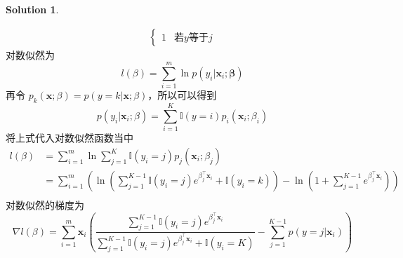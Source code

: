 \documentclass[a4paper,UTF8]{article}
\numberwithin{equation}{section}
\theoremstyle{definition}
\newtheorem*{solution}{Solution}
\def \x {\mathbf{x}}
\begin{document}
\begin{solution}
\begin{itemize}
\begin{align*}
\begin{cases}
				1 & \text{若$y$等于$j$}
			\end{cases}
		\end{align*}
		对数似然为
		\begin{equation*}
			l (\beta) = \sum_{i=1}^{m} \ln p(y_i|\x_i;\mathbf{\beta})
		\end{equation*}
		再令 $p_k(\x;\beta) = p(y=k|\x;\beta)$，所以可以得到
		\begin{equation*}
			p(y_i|\x_i; \beta) = \sum_{i=1}^{K}\mathbb{I}(y=i)p_i(\x_i;\beta_i)
		\end{equation*}
		将上式代入对数似然函数当中
		\begin{align*}
			l(\beta) &= \sum_{i=1}^{m} \ln \sum_{j=1}^{K}\mathbb{I}(y_i=j)p_j(\x_i; \beta_j) \\
			&= \sum_{i=1}^{m}\left(\ln \left( \sum_{j=1}^{K-1}\mathbb{I}(y_i=j)e^{\beta_j^\top\x_i} + \mathbb{I}(y_i=k) \right) - \ln \left( 1+\sum_{j=1}^{K-1}e^{\beta_j^\top\x_i} \right)   \right) \\
		\end{align*}
		对数似然的梯度为
		\begin{equation*}
			\nabla l(\beta) = \sum_{i=1}^{m}\x_i \left( \frac{\sum_{j=1}^{K-1}\mathbb{I}(y_i=j)e^{\beta_j^\top\x_i}}{\sum_{j=1}^{K-1} \mathbb{I}(y_i=j)e^{\beta_j^\top\x_i}+\mathbb{I}(y_i=K)} - \sum_{j=1}^{K-1} p(y=j|\x_i) \right)
		\end{equation*}
	\end{itemize}
	~\\
	~\\
	~\\
\end{solution}

\newpage
\end{document}
